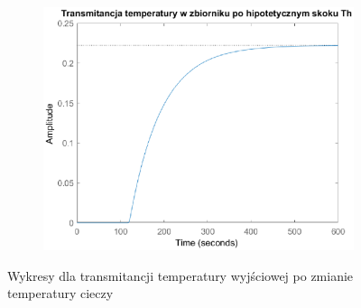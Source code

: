 \begin{figure}[h!]
   \begin{subfigure}[b]{0.6\textwidth}
      \includegraphics[width=1\linewidth]{img/transforms/transformTTh.eps}
      \caption{}
      \label{fig:fig:transformTT3}
   \end{subfigure}
       
   \caption{Wykresy dla transmitancji temperatury wyjściowej po zmianie temperatury cieczy}
   \label{fig:transformTT}
\end{figure}
           
